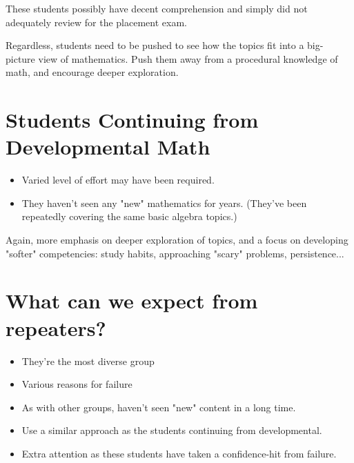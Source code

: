 \documentclass{ximera}
\begin{document}
\begin{corollary}
These students possibly have decent comprehension and simply did not 
adequately review for the placement exam. \\
\end{corollary}

Regardless, students need to be pushed to see how the topics fit into a big-
picture view of mathematics. Push them away from a procedural knowledge of
math, and encourage deeper exploration.\\

\section{Students Continuing from Developmental Math}

\begin{itemize}
\item Varied level of effort may have been required. 
\item They haven't seen any "new" mathematics for years. (They've been repeatedly covering the same basic algebra
topics.)
\end{itemize}

Again, more emphasis on deeper exploration of topics, and a focus on developing
"softer" competencies: study habits, approaching "scary" problems, persistence...\\


\section{What can we expect from repeaters?}

\begin{itemize}
\item They're the most diverse group
\item Various reasons for failure
\item As with other groups, haven't seen "new" content in a long time.
\item Use a similar approach as the students continuing from developmental.
\item Extra attention as these students have taken a confidence-hit from failure.
\end{itemize}
\end{document}
